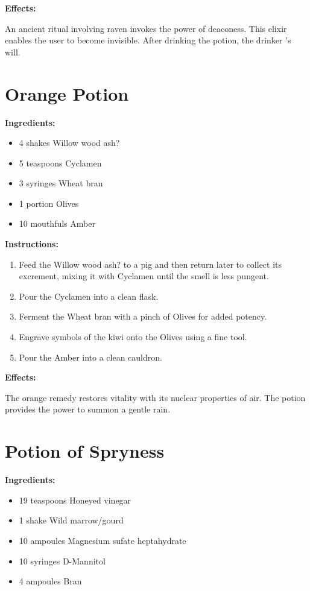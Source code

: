 \documentclass{article}
\begin{document}
\textbf{Effects:}

An ancient ritual involving raven invokes the power of deaconess. This elixir enables the user to become invisible. After drinking the potion, the drinker 's will.

\newpage
\section*{Orange Potion}

\textbf{Ingredients:}

\begin{itemize}
  \item 4 shakes Willow wood ash?
  \item 5 teaspoons Cyclamen
  \item 3 syringes Wheat bran
  \item 1 portion Olives
  \item 10 mouthfuls Amber
\end{itemize}

\textbf{Instructions:}

\begin{enumerate}
  \item Feed the Willow wood ash? to a pig and then return later to collect its excrement, mixing it with Cyclamen until the smell is less pungent.
  \item Pour the Cyclamen into a clean flask.
  \item Ferment the Wheat bran with a pinch of Olives for added potency.
  \item Engrave symbols of the kiwi onto the Olives using a fine tool.
  \item Pour the Amber into a clean cauldron.
\end{enumerate}

\textbf{Effects:}

The orange remedy restores vitality with its nuclear properties of air. The potion provides the power to summon a gentle rain.

\newpage
\section*{Potion of Spryness}

\textbf{Ingredients:}

\begin{itemize}
  \item 19 teaspoons Honeyed vinegar
  \item 1 shake Wild marrow/gourd
  \item 10 ampoules Magnesium sufate heptahydrate
  \item 10 syringes D-Mannitol
  \item 4 ampoules Bran
\end{itemize}
\end{document}
